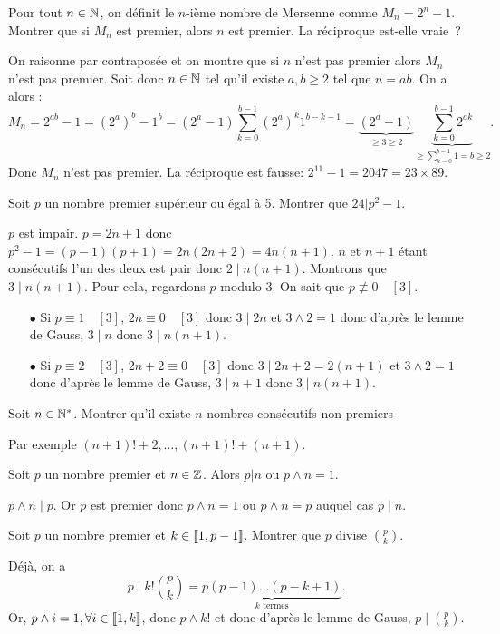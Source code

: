 \documentclass{magnolia}
\begin{document}
\begin{exos}
\exo Pour tout $n\in\mathbb{N}$, on définit le $n$-ième nombre de Mersenne comme
  $M_n=2^n-1$. Montrer que si $M_n$ est premier, alors $n$ est premier. La
  réciproque est-elle vraie~?
  \begin{sol}
  On raisonne par contraposée et on montre que si $n$ n'est pas premier alors $M_n$ n'est pas premier. Soit donc $n\in \mathbb{N}$ tel qu'il existe $a,b\geq 2$ tel que $n=ab$. On a alors :
  $$M_n=2^{ab}-1=(2^a)^b-1^b=(2^a-1)\sum_{k=0}^{b-1}(2^{a})^k1^{b-k-1}=\underbrace{(2^a-1)}_{\geq 3\geq 2}\underbrace{\sum_{k=0}^{b-1}2^{ak}}_{\geq \sum_{k=0}^{b-1}1=b\geq 2 }.$$ Donc $M_n$ n'est pas premier.
  La réciproque est fausse: $2^{11}-1=2047=23\times 89$.
  \end{sol}
\exo Soit $p$ un nombre premier supérieur ou égal à 5. Montrer que
  $24|p^2-1$.
  \begin{sol}
  $p$ est impair. $p=2n+1$ donc $p^2-1=(p-1)(p+1)=2n(2n+2)=4n(n+1)$.
  $n$ et $n+1$ étant consécutifs l'un des deux est pair donc $2\mid n(n+1)$. Montrons que $3\mid n(n+1)$. Pour cela, regardons $p$ modulo $3$. On sait que $p\not\equiv 0 \quad [3]$.
  \begin{itemize}
  \item[$\bullet$]Si $p\equiv 1 \quad [3]$, $2n\equiv 0 \quad [3]$ donc $3\mid 2n$ et $3\wedge 2=1$ donc d'après le lemme de Gauss, $3\mid n$ donc $3\mid n(n+1)$.
  \item[$\bullet$]Si $p\equiv 2 \quad [3]$, $2n+2\equiv 0 \quad [3]$ donc $3\mid 2n+2=2(n+1)$ et $3\wedge 2=1$ donc d'après le lemme de Gauss, $3\mid n+1$ donc $3\mid n(n+1)$.
  \end{itemize}
  \end{sol}
\exo Soit $n\in{\mathbb{N}^*}$. Montrer qu'il existe $n$ nombres consécutifs non
  premiers
  \begin{sol}
  Par exemple $(n+1)!+2,\ldots,(n+1)!+(n+1)$.
  \end{sol}
\end{exos}

\begin{proposition}
Soit $p$ un nombre premier et $n\in\mathbb{Z}$. Alors $p|n$ ou $p\wedge n=1$.
\end{proposition}

\begin{preuve}
$p\wedge n \mid p$. Or $p$ est premier donc $p\wedge n=1$ ou $p\wedge n=p$ auquel cas $p\mid n$.
\end{preuve}

\begin{exoUnique}
\exo Soit $p$ un nombre premier et $k\in\left\llbracket 1,p-1\right\rrbracket$. Montrer que
  $p$ divise $\binom{p}{k}$.
\end{exoUnique}
\begin{sol}
Déjà, on a $$p\mid k!\binom{p}{k}=\underbrace{p(p-1)\ldots (p-k+1)}_{k \text{ termes}}.$$
Or, $p\wedge i=1, \forall i \in \left\llbracket 1,k\right\rrbracket$, donc $p\wedge k!$ et donc d'après le lemme de Gauss, $p\mid \binom{p}{k}$.
\end{sol}
\end{document}
